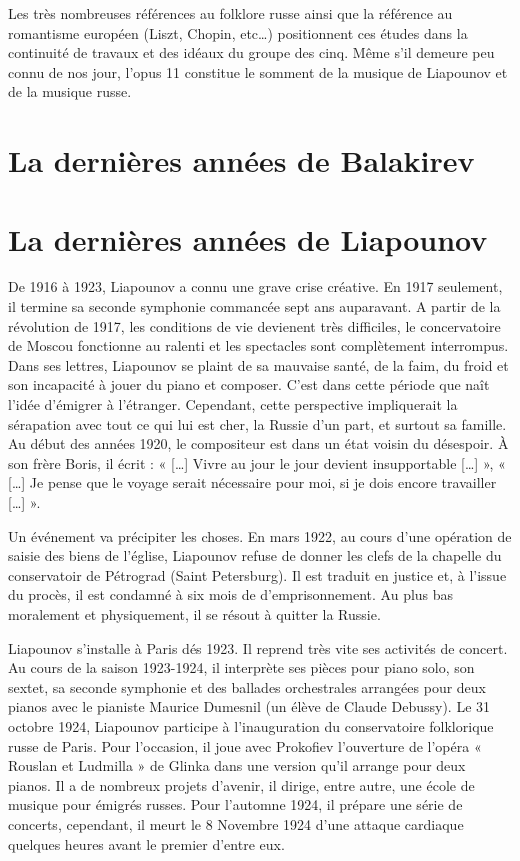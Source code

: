 Les très nombreuses références au folklore russe ainsi que la référence au romantisme européen (Liszt, Chopin, etc\dots) positionnent ces études dans la continuité de travaux et des idéaux du groupe des cinq. Même s'il demeure peu connu de nos jour, l'opus 11 constitue le somment de la musique de Liapounov et de la musique russe.

\newpage

\section{La dernières années de Balakirev}

\section{La dernières années de Liapounov}

De 1916 à 1923, Liapounov a connu une grave crise créative. En 1917 seulement, il termine sa seconde symphonie commancée sept ans auparavant. A partir de la révolution de 1917, les conditions de vie devienent très difficiles, le concervatoire de Moscou fonctionne au ralenti et les spectacles sont complètement interrompus. Dans ses lettres, Liapounov se plaint de sa mauvaise santé, de la faim, du froid et son incapacité à jouer du piano et composer. C'est dans cette période que naît l'idée d'émigrer à l'étranger. Cependant, cette perspective impliquerait la sérapation avec tout ce qui lui est cher, la Russie d'un part, et surtout sa famille. Au début des années 1920, le compositeur est dans un état voisin du désespoir. À son frère Boris, il écrit : « [\dots] Vivre au jour le jour devient insupportable [\dots] », « [\dots] Je pense que le voyage serait nécessaire pour moi, si je dois encore travailler [\dots] ».

Un événement va précipiter les choses. En mars 1922, au cours d'une opération de saisie des biens de l'église, Liapounov refuse de donner les clefs de la chapelle du conservatoir de Pétrograd (Saint Petersburg). Il est traduit en justice et, à l'issue du procès, il est condamné à six mois de d'emprisonnement. Au plus bas moralement et physiquement, il se résout à quitter la Russie.

Liapounov s'installe à Paris dés 1923. Il reprend très vite ses activités de concert. Au cours de la saison 1923-1924, il interprète ses pièces pour piano solo, son sextet, sa seconde symphonie et des ballades orchestrales arrangées pour deux pianos avec le pianiste Maurice Dumesnil (un élève de Claude Debussy). Le 31 octobre 1924, Liapounov participe à l'inauguration du conservatoire folklorique russe de Paris. Pour l'occasion, il joue avec Prokofiev l'ouverture de l'opéra « Rouslan et Ludmilla » de Glinka dans une version qu'il arrange pour deux pianos. Il a de nombreux projets d'avenir, il dirige, entre autre, une école de musique pour émigrés russes. Pour l'automne 1924, il prépare une série de concerts, cependant, il meurt le 8 Novembre 1924 d'une attaque cardiaque quelques heures avant le premier d'entre eux.

